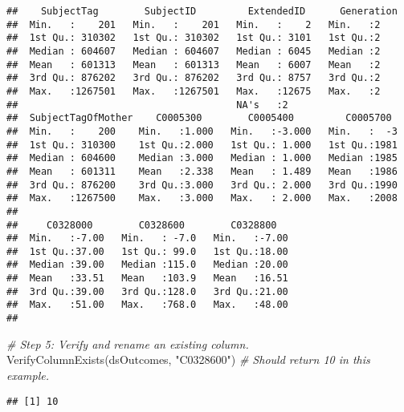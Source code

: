 \documentclass[smallextended]{svjour3}       %
\newenvironment{Shaded}{\begin{snugshade}}{\end{snugshade}}
\newcommand{\CommentTok}[1]{\textcolor[rgb]{0.56,0.35,0.01}{\textit{#1}}}
\newcommand{\FunctionTok}[1]{\textcolor[rgb]{0.00,0.00,0.00}{#1}}
\newcommand{\NormalTok}[1]{#1}
\newcommand{\StringTok}[1]{\textcolor[rgb]{0.31,0.60,0.02}{#1}}
\begin{document}
\begin{verbatim}
##    SubjectTag        SubjectID         ExtendedID      Generation
##  Min.   :    201   Min.   :    201   Min.   :    2   Min.   :2   
##  1st Qu.: 310302   1st Qu.: 310302   1st Qu.: 3101   1st Qu.:2   
##  Median : 604607   Median : 604607   Median : 6045   Median :2   
##  Mean   : 601313   Mean   : 601313   Mean   : 6007   Mean   :2   
##  3rd Qu.: 876202   3rd Qu.: 876202   3rd Qu.: 8757   3rd Qu.:2   
##  Max.   :1267501   Max.   :1267501   Max.   :12675   Max.   :2   
##                                      NA's   :2                   
##  SubjectTagOfMother    C0005300        C0005400         C0005700   
##  Min.   :    200    Min.   :1.000   Min.   :-3.000   Min.   :  -3  
##  1st Qu.: 310300    1st Qu.:2.000   1st Qu.: 1.000   1st Qu.:1981  
##  Median : 604600    Median :3.000   Median : 1.000   Median :1985  
##  Mean   : 601311    Mean   :2.338   Mean   : 1.489   Mean   :1986  
##  3rd Qu.: 876200    3rd Qu.:3.000   3rd Qu.: 2.000   3rd Qu.:1990  
##  Max.   :1267500    Max.   :3.000   Max.   : 2.000   Max.   :2008  
##                                                                    
##     C0328000        C0328600        C0328800    
##  Min.   :-7.00   Min.   : -7.0   Min.   :-7.00  
##  1st Qu.:37.00   1st Qu.: 99.0   1st Qu.:18.00  
##  Median :39.00   Median :115.0   Median :20.00  
##  Mean   :33.51   Mean   :103.9   Mean   :16.51  
##  3rd Qu.:39.00   3rd Qu.:128.0   3rd Qu.:21.00  
##  Max.   :51.00   Max.   :768.0   Max.   :48.00  
## 
\end{verbatim}

\begin{Shaded}
\begin{Highlighting}[]
\CommentTok{\# Step 5: Verify and rename an existing column.}
\FunctionTok{VerifyColumnExists}\NormalTok{(dsOutcomes, }\StringTok{"C0328600"}\NormalTok{) }\CommentTok{\# Should return 10 in this example.}
\end{Highlighting}
\end{Shaded}

\begin{verbatim}
## [1] 10
\end{verbatim}
\end{document}
